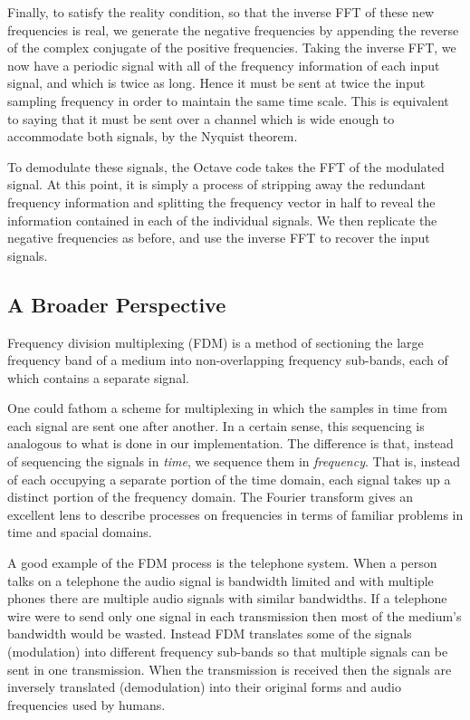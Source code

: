 \documentclass[12pt]{article}
\begin{document}
Finally, to satisfy the reality condition, so that the inverse FFT of these
new frequencies is real, we generate the negative frequencies by appending
the reverse of the complex conjugate of the positive frequencies. Taking the
inverse FFT, we now have a periodic signal with all of the frequency
information of each input signal, and which is twice as long. Hence it must
be sent at twice the input sampling frequency in order to maintain the same
time scale. This is equivalent to saying that it must be sent over a channel
which is wide enough to accommodate both signals, by the Nyquist theorem.

To demodulate these signals, the Octave code takes the FFT of the modulated
signal. At this point, it is simply a process of stripping away the redundant
frequency information and splitting the frequency vector in half to reveal
the information contained in each of the individual signals. We then
replicate the negative frequencies as before, and use the inverse FFT to
recover the input signals.

\subsection{A Broader Perspective}
Frequency division multiplexing (FDM) is a method of sectioning the large
frequency band of a medium into non-overlapping frequency sub-bands, each of
which contains a separate signal.

One could fathom a scheme for multiplexing in which the samples in time from
each signal are sent one after another. In a certain sense, this sequencing
is analogous to what is done in our implementation. The difference is that,
instead of sequencing the signals in \emph{time}, we sequence them in
\emph{frequency}. That is, instead of each occupying a separate portion of the
time domain, each signal takes up a distinct portion of the frequency domain.
The Fourier transform gives an excellent lens to describe processes on
frequencies in terms of familiar problems in time and spacial domains.

A good example of the FDM process is the telephone system. When a person talks
on a telephone the audio signal is bandwidth limited and with multiple phones
there are multiple audio signals with similar bandwidths. If a telephone
wire were to send only one signal in each transmission then most of the
medium’s bandwidth would be wasted. Instead FDM translates some of the signals
(modulation) into different frequency sub-bands so that multiple signals can be
sent in one transmission. When the transmission is received then the signals
are inversely translated (demodulation) into their original forms and audio
frequencies used by humans.
\end{document}
